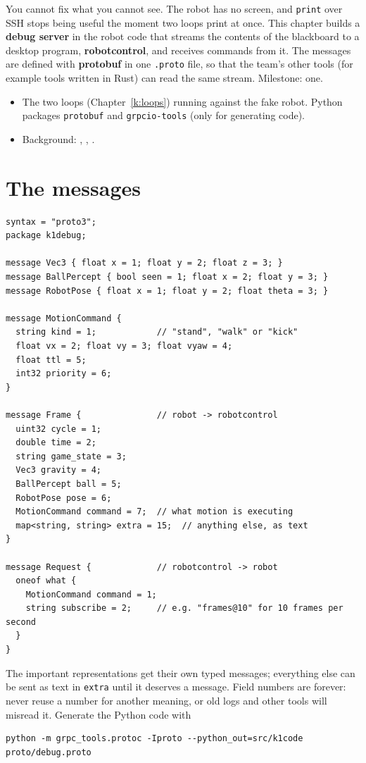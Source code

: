 \label{k:rc}

You cannot fix what you cannot see. The robot has no screen, and \texttt{print} over SSH stops being useful the moment two loops print at once. This chapter builds a \textbf{debug server} in the robot code that streams the contents of the blackboard to a desktop program, \textbf{robotcontrol}, and receives commands from it. The messages are defined with \textbf{protobuf} in one \texttt{.proto} file, so that the team's other tools (for example tools written in Rust) can read the same stream. Milestone: one.

\begin{needbox}
\begin{itemize}[nosep]
  \item The two loops (Chapter~\ref{k:loops}) running against the fake robot. Python packages \texttt{protobuf} and \texttt{grpcio-tools} (only for generating code).
  \item Background: , , .
\end{itemize}
\end{needbox}

\section*{The messages}
\begin{verbatim}
syntax = "proto3";
package k1debug;

message Vec3 { float x = 1; float y = 2; float z = 3; }
message BallPercept { bool seen = 1; float x = 2; float y = 3; }
message RobotPose { float x = 1; float y = 2; float theta = 3; }

message MotionCommand {
  string kind = 1;            // "stand", "walk" or "kick"
  float vx = 2; float vy = 3; float vyaw = 4;
  float ttl = 5;
  int32 priority = 6;
}

message Frame {               // robot -> robotcontrol
  uint32 cycle = 1;
  double time = 2;
  string game_state = 3;
  Vec3 gravity = 4;
  BallPercept ball = 5;
  RobotPose pose = 6;
  MotionCommand command = 7;  // what motion is executing
  map<string, string> extra = 15;  // anything else, as text
}

message Request {             // robotcontrol -> robot
  oneof what {
    MotionCommand command = 1;
    string subscribe = 2;     // e.g. "frames@10" for 10 frames per second
  }
}
\end{verbatim}
The important representations get their own typed messages; everything else can be sent as text in \texttt{extra} until it deserves a message. Field numbers are forever: never reuse a number for another meaning, or old logs and other tools will misread it. Generate the Python code with
\begin{verbatim}
python -m grpc_tools.protoc -Iproto --python_out=src/k1code proto/debug.proto
\end{verbatim}

